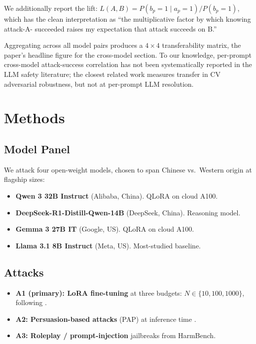 \documentclass[11pt,letterpaper]{article}
\begin{document}
We additionally report the lift:
$L(A, B) = P(b_p = 1 \mid a_p = 1) / P(b_p = 1)$, which has the clean
interpretation as ``the multiplicative factor by which knowing attack-A-
succeeded raises my expectation that attack succeeds on B.''

Aggregating across all model pairs produces a $4 \times 4$
transferability matrix, the paper's headline figure for the cross-model
section. To our knowledge, per-prompt cross-model attack-success
correlation has not been systematically reported in the LLM safety
literature; the closest related work measures transfer in CV adversarial
robustness, but not at per-prompt LLM resolution.

\section{Methods}
\label{sec:methods}

\subsection{Model Panel}

We attack four open-weight models, chosen to span Chinese vs.\ Western
origin at flagship sizes:

\begin{itemize}
  \item \textbf{Qwen 3 32B Instruct} (Alibaba, China). QLoRA on cloud A100.
  \item \textbf{DeepSeek-R1-Distill-Qwen-14B} (DeepSeek, China). Reasoning model.
  \item \textbf{Gemma 3 27B IT} (Google, US). QLoRA on cloud A100.
  \item \textbf{Llama 3.1 8B Instruct} (Meta, US). Most-studied baseline.
\end{itemize}

\subsection{Attacks}

\begin{itemize}
  \item \textbf{A1 (primary): LoRA fine-tuning} at three budgets:
        $N \in \{10, 100, 1000\}$, following \citet{qi2023finetuning}.
  \item \textbf{A2: Persuasion-based attacks} (PAP) at inference time \citep{zeng2024persuasion}.
  \item \textbf{A3: Roleplay / prompt-injection} jailbreaks from HarmBench.
\end{itemize}
\end{document}
